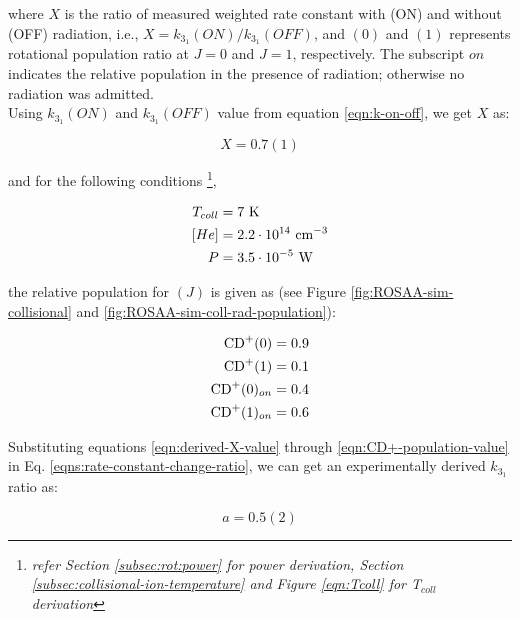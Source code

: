 where $X$ is the ratio of measured weighted rate constant with (ON) and without
(OFF) radiation, i.e., $X=k_{3_1}(ON) / k_{3_1}(OFF)$, and \CD$(0)$ and \CD$(1)$
represents \CD rotational population ratio at $J=0$ and $J=1$, respectively.
The subscript $on$ indicates the relative population in the presence of
radiation; otherwise no radiation was admitted.\\

Using $k_{3_1}(ON)$ and $k_{3_1}(OFF)$ value from equation \ref{eqn:k-on-off},
we get $X$ as:

\begin{equation}
    X = 0.7(1)
    \label{eqn:derived-X-value}
\end{equation}

and for the following conditions \footnote{\textit{refer Section
        \ref{subsec:rot:power} for power derivation, Section
        \ref{subsec:collisional-ion-temperature} and Figure \ref{eqn:Tcoll} for
        T$_{coll}$ derivation}},

\begin{align*}
    T_{coll} & = 7\ \text{K}                      \\
    [He]     & = 2.2 \cdot 10^{14}\ \text{cm$^{-3}$} \\
    P        & = 3.5 \cdot 10^{-5}\ \text{W}
\end{align*}

the relative population for \CD$(J)$ is given as (see Figure
\ref{fig:ROSAA-sim-collisional} and \ref{fig:ROSAA-sim-coll-rad-population}):

\begin{align}
    \text{CD}^+(0)      & = 0.9                                  \\
    \text{CD}^+(1)      & = 0.1                                  \\
    \text{CD}^+(0)_{on} & = 0.4                                  \\
    \text{CD}^+(1)_{on} & = 0.6 \label{eqn:CD+-population-value}
\end{align}

Substituting equations \ref{eqn:derived-X-value} through
\ref{eqn:CD+-population-value} in Eq. \ref{eqns:rate-constant-change-ratio}, we
can get an experimentally derived $k_{3_1}$ ratio as:

\begin{equation}
    a = 0.5(2)
    \label{eqn:k31-ratio}
\end{equation}

